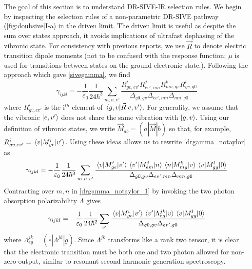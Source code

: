 \documentclass[aip, jcp, reprint, onecolumn]{revtex4-2}
\begin{document}
The goal of this section is to understand DR-SIVE-IR selection rules.
We begin by inspecting the selection rules of a non-parametric DR-SIVE pathway (\autoref{fig:doubsive}I-a) in the driven limit. 
The driven limit is useful as despite the sum over states approach, it avoids implications of ultrafast dephasing of the vibronic state.\cite{Cho2001} 
For consistency with previous reports, we use $\vec{R}$ to denote electric transition dipole moments (not to be confused with the response function; $\mu$ is used for transitions between states on the ground electronic state.). \cite{Ziegler1974}
Following the approach which gave \autoref{sivegamma}, we find
\begin{equation}\label{drgamma_notaylor}
	\gamma_{ijkl} = -\frac{1}{\varepsilon_0} \frac{1}{24 \hbar^3} \sum_{m,n,v'} \frac{
		R^{i}_{gv,ev'} 
		R^{j}_{ev',mn} 
		R^{k}_{mn,gv} 
		R^{l}_{gv,g0} 
	}{\Delta_{g0,gv}
		\Delta_{ev', mn}
		\Delta_{mn, g0}
	}
\end{equation}
where $R^{i}_{gv,ev'}$ is the i$^{th}$ element of $\mel{g,v}{\vec{R}}{e,v'}$.
For generality, we assume that the vibronic  $\ket{e,v'}$ does not share the same vibration with $\ket{g,v}$. \cite{Ziegler1988}
Using our definition of vibronic states, we write $\vec{M}_{ab} = (a|\vec{M}|b)$ so that, for example,
$R^{i}_{gv,ev'} = \mel{v}{M^i_{ge}}{v'}$.\cite{Albrecht1960}
Using these ideas allows us to rewrite \autoref{drgamma_notaylor} as
\begin{equation}\label{drgamma_notaylor_1}
	\gamma_{ijkl} = -\frac{1}{\varepsilon_0} \frac{1}{24 \hbar^3} \sum_{m,n,v'} \frac{
		\mel{v}{M^{i}_{ge}}{v'} 
		\mel{v'}{M^{j}_{em}}{n}
		\mel{n}{M^{k}_{mg} }{v}
		\mel{v}{M^{l}_{gg}}{0}
	}{\Delta_{g0,gv}
		\Delta_{ev', mn}
		\Delta_{mn, g0}	}
\end{equation}
Contracting over $m,n$ in \autoref{drgamma_notaylor_1} by invoking the two photon absorption polarizability $\Lambda$ gives \cite{McClain1977, Simpson2004, Olson2018}
\begin{equation}\label{drgamma_alpha_0}
	\gamma_{ijkl} = -\frac{1}{\varepsilon_0} \frac{1}{24 \hbar^2} \sum_{v'} \frac{
		\mel{v}{M^{i}_{ge}}{v'} 
		\mel{v'}{\Lambda^{jk}_{eg}}{v}
		\mel{v}{M^{l}_{gg}}{0}
	}{\Delta_{g0,gv}
		\Delta_{ev', g0}
	}
\end{equation}
where ${\Lambda^{jk}_{eg}} = (e|\Lambda^{jk}|g)$. 
Since $\Lambda^{jk}$ transforms like a rank two tensor, it is clear that the electronic transition must be both one and two photon allowed for non-zero output, similar to resonant second harmonic generation spectroscopy. \cite{Heinz1982, Nguyen1986, Simpson2004}
\end{document}

